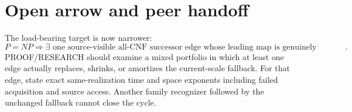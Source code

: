 \documentclass[11pt]{article}
\begin{document}
\section{Open arrow and peer handoff}
The load-bearing target is now narrower:
\[
 P=NP\Longrightarrow\exists\text{ one source-visible all-CNF successor edge
whose leading map is genuinely contractive in a joint model}.
\]
PROOF/RESEARCH should examine a mixed portfolio in which at least one edge
actually replaces, shrinks, or amortizes the current-scale fallback.  For
that edge, state exact same-realization time and space exponents including
failed acquisition and source access.  Another family recognizer followed by
the unchanged fallback cannot close the cycle.



\end{document}
